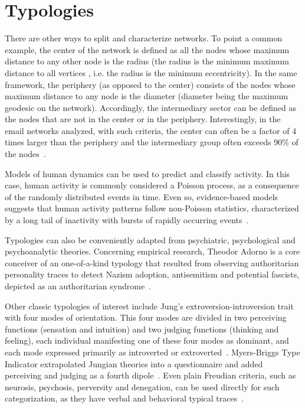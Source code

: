 \documentclass[%
 aip,
 jmp,%
 amsmath,amssymb,
 reprint,%
]{revtex4-1}
\begin{document}
\section{Typologies}\label{ap:typ}
There are other ways to split and characterize networks. To point a common example, the center of the network is defined as all the nodes whose maximum distance to any other node is the radius (the radius is the minimum maximum distance to all vertices , i.e. the radius is the minimum eccentricity). 
In the same framework, the periphery (as opposed to the center) consists of the nodes whose maximum distance to any node is the diameter (diameter being the maximum geodesic on the network). Accordingly, the intermediary sector can be defined as the nodes that are not in the center or in the periphery. Interestingly, in the email networks analyzed, with such criteria, the center can often be a factor of 4 times larger than the periphery and the intermediary group often exceeds 90\% of the nodes~\cite{networkx}.

Models of human dynamics can be used to predict and classify activity. In this case, human activity is commonly considered a Poisson process, as a consequence of the randomly distributed events in time. Even so, evidence-based models suggests that human activity patterns follow non-Poisson statistics, characterized by a long tail of inactivity with bursts of rapidly occurring events~\cite{barabasiHumanDyn,barabasiPhone}.

Typologies can also be conveniently adapted from psychiatric, psychological and psychoanalytic theories.
Concerning empirical research,
Theodor Adorno is a core conceiver of an one-of-a-kind typology that resulted from observing authoritarian
personality traces to detect Nazism adoption, antisemitism and potential fascists, depicted as an authoritarian syndrome~\cite{adorno}.

Other classic typologies of interest include Jung's extroversion-introversion trait with four modes of orientation. This four modes are divided in two perceiving functions (sensation and intuition) and two judging functions (thinking and feeling), each individual manifesting one of these four modes as dominant, and each mode expressed primarily as introverted or extroverted~\cite{jung}. Myers-Briggs Type Indicator extrapolated Jungian theories into a questionnaire and added perceiving and judging as a fourth dipole~\cite{myers}. Even plain Freudian criteria, such as neurosis, psychosis, perversity and denegation, can be used directly for such categorization, as they have verbal and behavioral typical traces~\cite{freud,freud2}.
\end{document}

